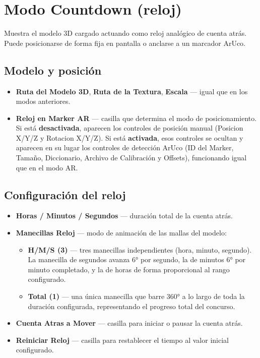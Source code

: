 \section*{Modo Countdown (reloj)}

Muestra el modelo 3D cargado actuando como reloj analógico de cuenta atrás. Puede posicionarse de forma fija en pantalla o anclarse a un marcador ArUco.

\subsection*{Modelo y posición}

\begin{itemize}
  \item \textbf{Ruta del Modelo 3D}, \textbf{Ruta de la Textura}, \textbf{Escala} — igual que en los modos anteriores.
  \item \textbf{Reloj en Marker AR} — casilla que determina el modo de posicionamiento. Si está \textbf{desactivada}, aparecen los controles de posición manual (Posicion X/Y/Z y Rotacion X/Y/Z). Si está \textbf{activada}, esos controles se ocultan y aparecen en su lugar los controles de detección ArUco (ID del Marker, Tamaño, Diccionario, Archivo de Calibración y Offsets), funcionando igual que en el modo AR.
\end{itemize}

\subsection*{Configuración del reloj}

\begin{itemize}
  \item \textbf{Horas / Minutos / Segundos} — duración total de la cuenta atrás.
  \item \textbf{Manecillas Reloj} — modo de animación de las mallas del modelo:
    \begin{itemize}
      \item \textbf{H/M/S (3)} — tres manecillas independientes (hora, minuto, segundo). La manecilla de segundos avanza $6°$ por segundo, la de minutos $6°$ por minuto completado, y la de horas de forma proporcional al rango configurado.
      \item \textbf{Total (1)} — una única manecilla que barre $360°$ a lo largo de toda la duración configurada, representando el progreso total del concurso.
    \end{itemize}
  \item \textbf{Cuenta Atras a Mover} — casilla para iniciar o pausar la cuenta atrás.
  \item \textbf{Reiniciar Reloj} — casilla para restablecer el tiempo al valor inicial configurado.
\end{itemize}

